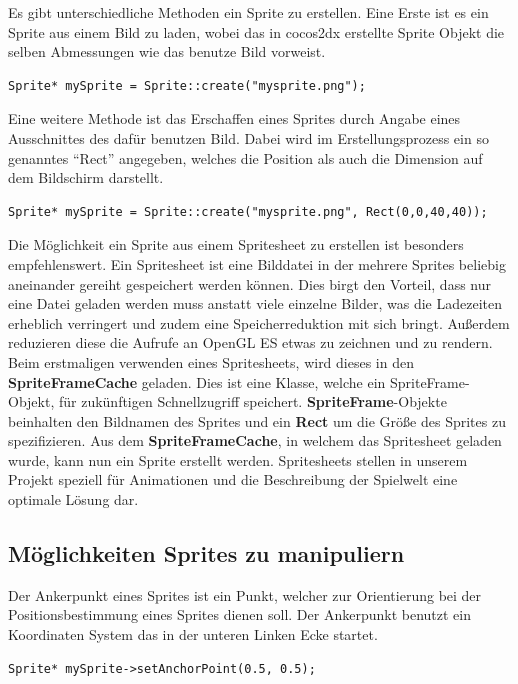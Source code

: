 Es gibt unterschiedliche Methoden ein Sprite zu erstellen. Eine Erste ist es ein Sprite aus einem Bild zu laden, wobei das in cocos2dx erstellte Sprite Objekt die selben Abmessungen wie das benutze Bild vorweist. 

\begin{lstlisting}[style=singleline]
Sprite* mySprite = Sprite::create("mysprite.png");
\end{lstlisting}

Eine weitere Methode ist das Erschaffen eines Sprites durch Angabe eines Ausschnittes des dafür benutzen Bild. Dabei wird im Erstellungsprozess ein so genanntes “Rect” angegeben, welches die Position als auch die Dimension auf dem Bildschirm darstellt. 

\begin{lstlisting}[style=singleline]
Sprite* mySprite = Sprite::create("mysprite.png", Rect(0,0,40,40));
\end{lstlisting}

Die Möglichkeit ein Sprite aus einem Spritesheet zu erstellen ist besonders empfehlenswert. Ein Spritesheet ist eine Bilddatei in der mehrere Sprites beliebig aneinander gereiht gespeichert werden können. Dies birgt den Vorteil, dass nur eine Datei geladen werden muss anstatt viele einzelne Bilder, was die Ladezeiten erheblich verringert und zudem eine Speicherreduktion mit sich bringt. Außerdem reduzieren diese die Aufrufe an OpenGL ES etwas zu zeichnen und zu rendern. Beim erstmaligen verwenden eines Spritesheets, wird dieses in den \textbf{SpriteFrameCache} geladen.  Dies ist eine Klasse, welche ein SpriteFrame-Objekt, für zukünftigen Schnellzugriff speichert. \textbf{SpriteFrame}-Objekte beinhalten den Bildnamen des Sprites und ein \textbf{Rect} um die Größe des Sprites zu spezifizieren. Aus dem \textbf{SpriteFrameCache}, in welchem das Spritesheet geladen wurde, kann nun ein Sprite erstellt werden.
Spritesheets stellen in unserem Projekt speziell für Animationen und die Beschreibung der Spielwelt eine optimale Lösung dar. 


\subsection{Möglichkeiten Sprites zu manipuliern}
Der Ankerpunkt eines Sprites ist ein Punkt, welcher zur Orientierung bei der Positionsbestimmung eines Sprites dienen soll. Der Ankerpunkt benutzt ein Koordinaten System das in der unteren Linken Ecke startet. 

\begin{lstlisting}[style=singleline]
Sprite* mySprite->setAnchorPoint(0.5, 0.5);
\end{lstlisting}


